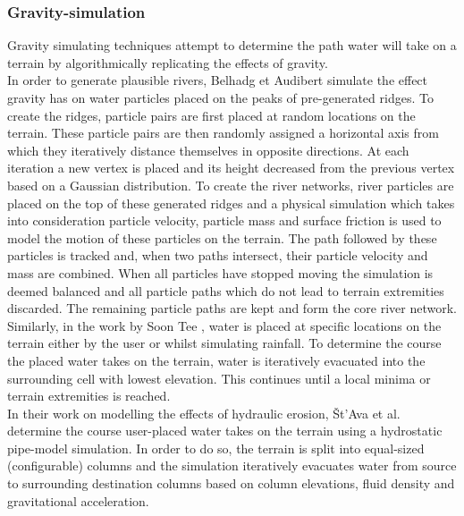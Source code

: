 \subsubsection{Gravity-simulation} \label{ssec:gravitation}

Gravity simulating techniques attempt to determine the path water will take on a terrain by algorithmically replicating the effects of gravity. \\

In order to generate plausible rivers, Belhadg et Audibert \cite{Belhadj2005} simulate the effect gravity has on water particles placed on the peaks of pre-generated ridges. To create the ridges, particle pairs are first placed at random locations on the terrain. These particle pairs are then randomly assigned a horizontal axis from which they iteratively distance themselves in opposite directions. At each iteration a new vertex is placed and its height decreased from the previous vertex based on a Gaussian distribution. To create the river networks, river particles are placed on the top of these generated ridges and a physical simulation which takes into consideration particle velocity, particle mass and surface friction is used to model the motion of these particles on the terrain. The path followed by these particles is tracked and, when two paths intersect, their particle velocity and mass are combined. When all particles have stopped moving the simulation is deemed balanced and all particle paths which do not lead to terrain extremities discarded. The remaining particle paths are kept and form the core river network. \\

Similarly, in the work by Soon Tee \cite{Teoh2008}, water is placed at specific locations on the terrain either by the user or whilst simulating rainfall. To determine the course the placed water takes on the terrain, water is iteratively evacuated into the surrounding cell with lowest elevation. This continues until a local minima or terrain extremities is reached.\\

In their work on modelling the effects of hydraulic erosion, Št'Ava et al. \cite{StAva2008} determine the course user-placed water takes on the terrain using a hydrostatic pipe-model simulation. In order to do so, the terrain is split into equal-sized (configurable) columns and the simulation iteratively evacuates water from source to surrounding destination columns based on column elevations, fluid density and gravitational acceleration. \\

